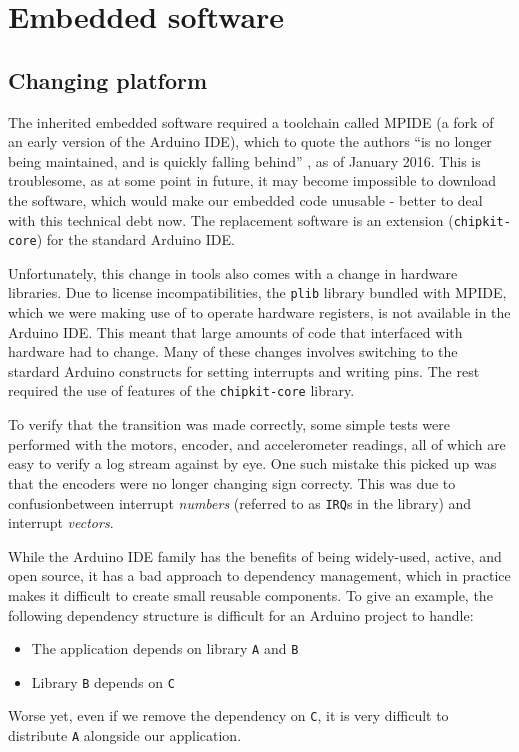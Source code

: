 \documentclass[main.tex]{subfiles}
\begin{document}
\section{Embedded software}

\subsection{Changing platform}

	The inherited embedded software required a toolchain called MPIDE (a fork of an early version of the Arduino IDE), which to quote the authors \enquote{is no longer being maintained, and is quickly falling behind} \cite{mpide}, as of January 2016. This is troublesome, as at some point in future, it may become impossible to download the software, which would make our embedded code unusable - better to deal with this technical debt now. The replacement software is an extension (\texttt{chipkit-core}) for the standard Arduino IDE.

	Unfortunately, this change in tools also comes with a change in hardware libraries. Due to license incompatibilities, the \texttt{plib} library bundled with MPIDE, which we were making use of to operate hardware registers, is not available in the Arduino IDE. This meant that large amounts of code that interfaced with hardware had to change. Many of these changes involves switching to the stardard Arduino constructs for setting interrupts and writing pins. The rest required the use of features of the \texttt{chipkit-core} library.

	To verify that the transition was made correctly, some simple tests were performed with the motors, encoder, and accelerometer readings, all of which are easy to verify a log stream against by eye. One such mistake this picked up was that the encoders were no longer changing sign correcty. This was due to confusion\footnotemark between interrupt \emph{numbers} (referred to as \texttt{IRQ}s in the library) and interrupt \emph{vectors}.


	While the Arduino IDE family has the benefits of being widely-used, active, and open source, it has a bad approach to dependency management, which in practice makes it difficult to create small reusable components. To give an example, the following dependency structure is difficult for an Arduino project to handle:
	\begin{itemize}
		\item The application depends on library \texttt{A} and \texttt{B}
		\item Library \texttt{B} depends on \texttt{C}
	\end{itemize}
	Worse yet, even if we remove the dependency on \texttt{C}, it is very difficult to distribute \texttt{A} alongside our application.
\end{document}
